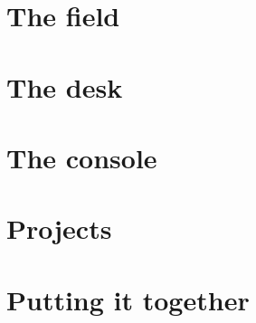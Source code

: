 \part{The field}





\part{The desk}











\part{The console}



\part{Projects}


\part{Putting it together}



\appendix




